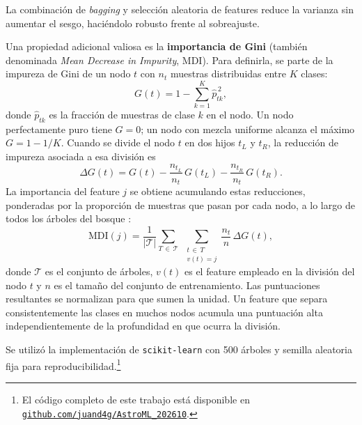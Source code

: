 \documentclass[letterpaper,12pt]{extarticle}
\begin{document}
La combinación de \textit{bagging} y selección aleatoria de features reduce la
varianza sin aumentar el sesgo, haciéndolo robusto frente al sobreajuste.

Una propiedad adicional valiosa es la \textbf{importancia de Gini} (también
denominada \textit{Mean Decrease in Impurity}, MDI). Para definirla, se parte
de la impureza de Gini \citep{breiman1984} de un nodo $t$ con $n_t$ muestras
distribuidas entre $K$ clases:
\begin{equation}\label{eq:gini}
    G(t) = 1 - \sum_{k=1}^{K} \hat{p}_{tk}^{\,2},
\end{equation}
donde $\hat{p}_{tk}$ es la fracción de muestras de clase $k$ en el nodo.
Un nodo perfectamente puro tiene $G=0$; un nodo con mezcla uniforme alcanza
el máximo $G = 1 - 1/K$. Cuando se divide el nodo $t$ en dos hijos $t_L$
y $t_R$, la reducción de impureza asociada a esa división es
\begin{equation}\label{eq:delta_gini}
    \Delta G(t) = G(t)
                 - \frac{n_{t_L}}{n_t}\,G(t_L)
                 - \frac{n_{t_R}}{n_t}\,G(t_R).
\end{equation}
La importancia del feature $j$ se obtiene acumulando estas reducciones,
ponderadas por la proporción de muestras que pasan por cada nodo, a lo largo
de todos los árboles del bosque \citep{breiman2001}:
\begin{equation}\label{eq:mdi}
    \mathrm{MDI}(j) =
        \frac{1}{|\mathcal{T}|}
        \sum_{T\,\in\,\mathcal{T}}\;
        \sum_{\substack{t\,\in\,T \\ v(t)=j}}
        \frac{n_t}{n}\,\Delta G(t),
\end{equation}
donde $\mathcal{T}$ es el conjunto de árboles, $v(t)$ es el feature empleado
en la división del nodo $t$ y $n$ es el tamaño del conjunto de entrenamiento.
Las puntuaciones resultantes se normalizan para que sumen la unidad. Un feature
que separa consistentemente las clases en muchos nodos acumula una puntuación
alta independientemente de la profundidad en que ocurra la división.

Se utilizó la implementación de \texttt{scikit-learn} \citep{sklearn2011} con
500 árboles y semilla aleatoria fija para reproducibilidad.\footnote{El código
completo de este trabajo está disponible en
\href{https://github.com/juand4g/AstroML_202610/tree/main/Trabajo\%20final}%
{\texttt{github.com/juand4g/AstroML\_202610}}.}

\end{document}
